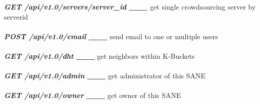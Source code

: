 \documentclass[12pt,oneside,a4paper]{article}
\begin{document}
\scriptsize{\textbf{\emph{GET  /api/v1.0/servers/server\_id \_\_\_}} get single crowdsourcing server by serverid}\\\\
\scriptsize{\textbf{\emph{POST  /api/v1.0/email \_\_\_}} send email to one or multiple users}\\\\
\scriptsize{\textbf{\emph{GET  /api/v1.0/dht \_\_\_}} get neighbors within K-Buckets}\\\\
\scriptsize{\textbf{\emph{GET  /api/v1.0/admin \_\_\_}} get administrator of this SANE}\\\\
\scriptsize{\textbf{\emph{GET  /api/v1.0/owner \_\_\_}} get owner of this SANE}\\
\end{document}

